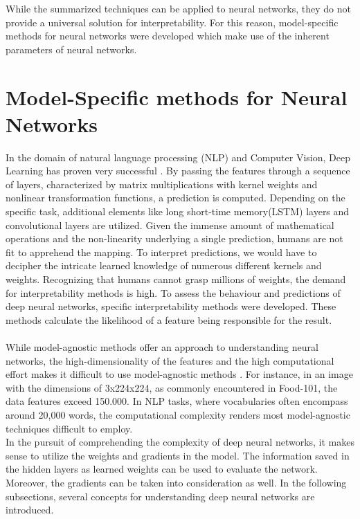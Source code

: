 While the summarized techniques can be applied to neural networks, they do not provide a universal solution for interpretability. For this reason, model-specific methods for neural networks were developed which make use of the inherent parameters of neural networks.

\section{Model-Specific methods for Neural Networks}
\label{sec:nni}
In the domain of natural language processing (NLP) and Computer Vision, Deep Learning has proven very successful \cite{delgado2014}. By passing the features through a sequence of layers, characterized by matrix multiplications with kernel weights and nonlinear transformation functions, a prediction is computed. Depending on the specific task, additional elements like long short-time memory(LSTM) layers and convolutional layers are utilized. Given the immense amount of mathematical operations and the non-linearity underlying a single prediction, humans are not fit to apprehend the mapping. To interpret predictions, we would have to decipher the intricate learned knowledge of numerous different kernels and weights.
Recognizing that humans cannot grasp millions of weights, the demand for interpretability methods is high. To assess the behaviour and predictions of deep neural networks, specific interpretability methods were developed. These methods calculate the likelihood of a feature being responsible for the result.
\\\\
While model-agnostic methods offer an approach to understanding neural networks, the high-dimensionality of the features and the high computational effort makes it difficult to use model-agnostic methods \cite{molnar2020}. For instance, in an image with the dimensions of 3x224x224, as commonly encountered in Food-101, the data features exceed 150.000. In NLP tasks, where vocabularies often encompass around 20,000 words, the computational complexity renders most model-agnostic techniques difficult to employ.
\\
In the pursuit of comprehending the complexity of deep neural networks, it makes sense to utilize the weights and gradients in the model. The information saved in the hidden layers as learned weights can be used to evaluate the network. Moreover, the gradients can be taken into consideration as well. In the following subsections, several concepts for understanding deep neural networks are introduced. 

